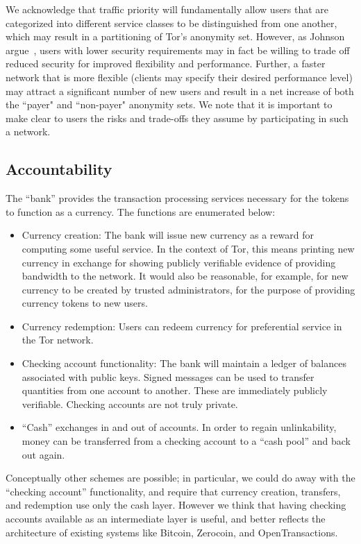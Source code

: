 
We acknowledge that traffic priority will fundamentally allow users that are
categorized into different service classes to be distinguished from one another,
which may result in a partitioning of Tor's anonymity set. However, as Johnson
\etal argue~\cite{johnson2013onions}, users with lower security requirements may
in fact be willing to trade off reduced security for improved flexibility and
performance. Further, a faster network that is more flexible (clients may
specify their desired performance level) may attract a significant number of new
users and result in a net increase of both the ``payer" and ``non-payer" anonymity
sets. We note that it is important to make clear to users the risks and
trade-offs they assume by participating in such a network.

\subsection{Accountability}

The ``bank'' provides the transaction processing services necessary for the tokens to function as a currency. The functions are enumerated below:
\begin{itemize}
\item Currency creation: The bank will issue new currency as a reward for computing some useful service. In the context of Tor, this means printing new currency in exchange for showing publicly verifiable evidence of providing bandwidth to the network. It would also be reasonable, for example, for new currency to be created by trusted administrators, for the purpose of providing currency tokens to new users.
\item Currency redemption: Users can redeem currency for preferential service in the Tor network.
\item Checking account functionality: The bank will maintain a ledger of balances associated with public keys. Signed messages can be used to transfer quantities from one account to another. These are immediately publicly verifiable. Checking accounts are not truly private.
\item “Cash” exchanges in and out of accounts. In order to regain unlinkability, money can be transferred from a checking account to a “cash pool” and back out again.  
\end{itemize}

Conceptually other schemes are possible; in particular, we could do away with the ``checking account'' functionality, and require that currency creation, transfers, and redemption use only the cash layer. 
However we think that having checking accounts available as an intermediate layer is useful, and better reflects the architecture of existing systems like Bitcoin, Zerocoin, and OpenTransactions.

